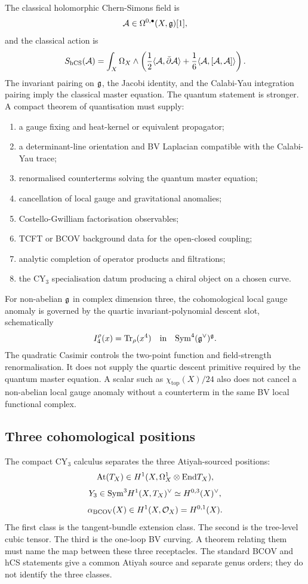 The classical holomorphic Chern-Simons field is
\[
\mathcal A\in\Omega^{0,\bullet}(X,\mathfrak{g})[1],
\]
and the classical action is
\[
S_{\mathrm{hCS}}(\mathcal A)
=
\int_X\Omega_X\wedge
\left(
\frac{1}{2}\langle\mathcal A,\bar\partial\mathcal A\rangle
+\frac{1}{6}\langle\mathcal A,[\mathcal A,\mathcal A]\rangle
\right).
\]
The invariant pairing on $\mathfrak{g}$, the Jacobi identity, and the
Calabi-Yau integration pairing imply the classical master equation.
The quantum statement is stronger. A compact theorem of quantisation
must supply:
\begin{enumerate}
\item a gauge fixing and heat-kernel or equivalent propagator;
\item a determinant-line orientation and BV Laplacian compatible with
the Calabi-Yau trace;
\item renormalised counterterms solving the quantum master equation;
\item cancellation of local gauge and gravitational anomalies;
\item Costello-Gwilliam factorisation observables;
\item TCFT or BCOV background data for the open-closed coupling;
\item analytic completion of operator products and filtrations;
\item the CY$_3$ specialisation datum producing a chiral object on a
chosen curve.
\end{enumerate}

For non-abelian $\mathfrak{g}$ in complex dimension three, the cohomological local
gauge anomaly is governed by the quartic invariant-polynomial descent
slot, schematically
\[
I_4^\rho(x)=\mathrm{Tr}_\rho(x^4)
\quad\text{in}\quad
\mathrm{Sym}^4(\mathfrak{g}^\vee)^{\mathfrak{g}} .
\]
The quadratic Casimir controls the two-point function and field-strength
renormalisation. It does not supply the quartic descent primitive required
by the quantum master equation. A scalar such as
$\chi_{\mathrm{top}}(X)/24$ also does not cancel a non-abelian local
gauge anomaly without a counterterm in the same BV local functional
complex.

\subsection*{Three cohomological positions}
\label{subsec:bcov-yukawa-three-slots}

The compact CY$_3$ calculus separates the three Atiyah-sourced positions:
\[
\mathrm{At}(T_X)\in H^1(X,\Omega^1_X\otimes\mathrm{End} T_X),
\]
\[
Y_3\in\mathrm{Sym}^3H^1(X,T_X)^\vee
\simeq H^{0,3}(X)^\vee ,
\]
\[
\alpha_{\mathrm{BCOV}}(X)\in H^1(X,\mathcal{O}_X)=H^{0,1}(X).
\]
The first class is the tangent-bundle extension class. The second is the
tree-level cubic tensor. The third is the one-loop BV curving. A theorem
relating them must name the map between these three receptacles. The
standard BCOV and hCS statements give a common Atiyah source and separate
genus orders; they do not identify the three classes.

